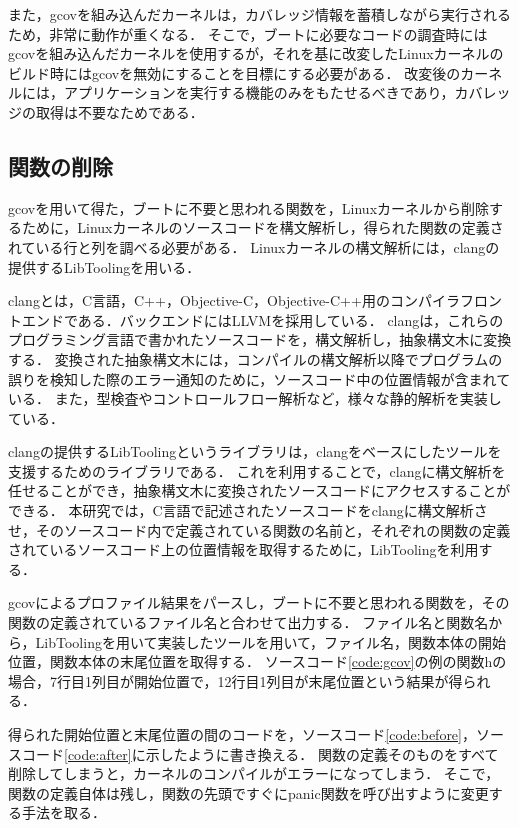 \documentclass[graduation-thesis]{mlarticle}
\begin{document}
また，gcovを組み込んだカーネルは，カバレッジ情報を蓄積しながら実行されるため，非常に動作が重くなる．
そこで，ブートに必要なコードの調査時にはgcovを組み込んだカーネルを使用するが，それを基に改変したLinuxカーネルのビルド時にはgcovを無効にすることを目標にする必要がある．
改変後のカーネルには，アプリケーションを実行する機能のみをもたせるべきであり，カバレッジの取得は不要なためである．

\subsection{関数の削除}
\label{implementation:function}
gcovを用いて得た，ブートに不要と思われる関数を，Linuxカーネルから削除するために，Linuxカーネルのソースコードを構文解析し，得られた関数の定義されている行と列を調べる必要がある．
Linuxカーネルの構文解析には，clang\cite{clang}の提供するLibToolingを用いる．

clangとは，C言語，C++，Objective-C，Objective-C++用のコンパイラフロントエンドである．バックエンドにはLLVMを採用している．
clangは，これらのプログラミング言語で書かれたソースコードを，構文解析し，抽象構文木に変換する．
変換された抽象構文木には，コンパイルの構文解析以降でプログラムの誤りを検知した際のエラー通知のために，ソースコード中の位置情報が含まれている．
また，型検査やコントロールフロー解析など，様々な静的解析を実装している．

clangの提供するLibToolingというライブラリは，clangをベースにしたツールを支援するためのライブラリである．
これを利用することで，clangに構文解析を任せることができ，抽象構文木に変換されたソースコードにアクセスすることができる．
本研究では，C言語で記述されたソースコードをclangに構文解析させ，そのソースコード内で定義されている関数の名前と，それぞれの関数の定義されているソースコード上の位置情報を取得するために，LibToolingを利用する．

gcovによるプロファイル結果をパースし，ブートに不要と思われる関数を，その関数の定義されているファイル名と合わせて出力する．
ファイル名と関数名から，LibToolingを用いて実装したツールを用いて，ファイル名，関数本体の開始位置，関数本体の末尾位置を取得する．
ソースコード\ref{code:gcov}の例の関数hの場合，7行目1列目が開始位置で，12行目1列目が末尾位置という結果が得られる．

得られた開始位置と末尾位置の間のコードを，ソースコード\ref{code:before}，ソースコード\ref{code:after}に示したように書き換える．
関数の定義そのものをすべて削除してしまうと，カーネルのコンパイルがエラーになってしまう．
そこで，関数の定義自体は残し，関数の先頭ですぐにpanic関数を呼び出すように変更する手法を取る．
\end{document}
